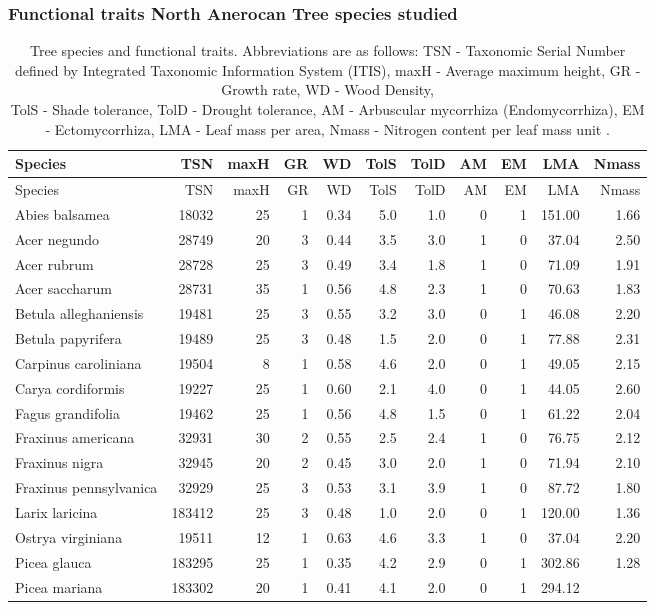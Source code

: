 \begin{landscape}

\subsubsection{Functional traits North Anerocan Tree species studied}

\begin{longtable}[]{@{}lrrrrrrrrrr@{}}
\caption[Tree species and functional traits]{Tree species and functional traits. Abbreviations are as follows: TSN
- Taxonomic Serial Number defined by Integrated Taxonomic Information
System (ITIS), maxH - Average maximum height, GR - Growth rate, WD -
Wood Density,\\
TolS - Shade tolerance, TolD - Drought tolerance, AM - Arbuscular
mycorrhiza (Endomycorrhiza), EM - Ectomycorrhiza, LMA - Leaf mass per
area, Nmass - Nitrogen content per leaf mass unit \citep{Paquette2011}.
\label{tbl:trees}}\tabularnewline
\toprule
Species & TSN & maxH & GR & WD & TolS & TolD & AM & EM & LMA &
Nmass\tabularnewline
\midrule
\endfirsthead
\toprule
Species & TSN & maxH & GR & WD & TolS & TolD & AM & EM & LMA &
Nmass\tabularnewline
\midrule
\endhead
Abies balsamea & 18032 & 25 & 1 & 0.34 & 5.0 & 1.0 & 0 & 1 & 151.00 &
1.66\tabularnewline
Acer negundo & 28749 & 20 & 3 & 0.44 & 3.5 & 3.0 & 1 & 0 & 37.04 &
2.50\tabularnewline
Acer rubrum & 28728 & 25 & 3 & 0.49 & 3.4 & 1.8 & 1 & 0 & 71.09 &
1.91\tabularnewline
Acer saccharum & 28731 & 35 & 1 & 0.56 & 4.8 & 2.3 & 1 & 0 & 70.63 &
1.83\tabularnewline
Betula alleghaniensis & 19481 & 25 & 3 & 0.55 & 3.2 & 3.0 & 0 & 1 &
46.08 & 2.20\tabularnewline
Betula papyrifera & 19489 & 25 & 3 & 0.48 & 1.5 & 2.0 & 0 & 1 & 77.88 &
2.31\tabularnewline
Carpinus caroliniana & 19504 & 8 & 1 & 0.58 & 4.6 & 2.0 & 0 & 1 & 49.05
& 2.15\tabularnewline
Carya cordiformis & 19227 & 25 & 1 & 0.60 & 2.1 & 4.0 & 0 & 1 & 44.05 &
2.60\tabularnewline
Fagus grandifolia & 19462 & 25 & 1 & 0.56 & 4.8 & 1.5 & 0 & 1 & 61.22 &
2.04\tabularnewline
Fraxinus americana & 32931 & 30 & 2 & 0.55 & 2.5 & 2.4 & 1 & 0 & 76.75 &
2.12\tabularnewline
Fraxinus nigra & 32945 & 20 & 2 & 0.45 & 3.0 & 2.0 & 1 & 0 & 71.94 &
2.10\tabularnewline
Fraxinus pennsylvanica & 32929 & 25 & 3 & 0.53 & 3.1 & 3.9 & 1 & 0 &
87.72 & 1.80\tabularnewline
Larix laricina & 183412 & 25 & 3 & 0.48 & 1.0 & 2.0 & 0 & 1 & 120.00 &
1.36\tabularnewline
Ostrya virginiana & 19511 & 12 & 1 & 0.63 & 4.6 & 3.3 & 1 & 0 & 37.04 &
2.20\tabularnewline
Picea glauca & 183295 & 25 & 1 & 0.35 & 4.2 & 2.9 & 0 & 1 & 302.86 &
1.28\tabularnewline
Picea mariana & 183302 & 20 & 1 & 0.41 & 4.1 & 2.0 & 0 & 1 & 294.12 &

\end{longtable}
\end{landscape}
